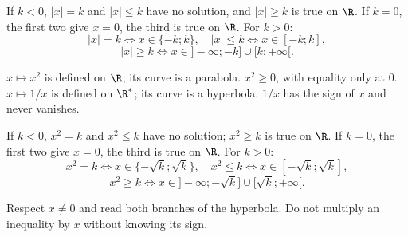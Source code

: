 \begin{cours}
If $k<0$, $|x|=k$ and $|x|\leq k$ have no solution, and $|x|\geq k$ is true on $\R$. If $k=0$, the first two give $x=0$, the third is true on $\R$. For $k>0$:
\[|x|=k\iff x\in\{-k;k\},\quad |x|\leq k\iff x\in[-k;k],\]
\[|x|\geq k\iff x\in]-\infty;-k]\cup[k;+\infty[.\]
\end{cours}
\reponse[1.6]{$\{-5;5\}$; $\varnothing$; $[-3;3]$; $]-\infty;-4]\cup[4;+\infty[$.}
\begin{cours}
$x\mapsto x^2$ is defined on $\R$; its curve is a parabola. $x^2\geq0$, with equality only at $0$.
$x\mapsto1/x$ is defined on $\R^*$; its curve is a hyperbola. $1/x$ has the sign of $x$ and never vanishes.
\end{cours}
\begin{center}
\end{center}
\begin{cours}
If $k<0$, $x^2=k$ and $x^2\leq k$ have no solution; $x^2\geq k$ is true on $\R$. If $k=0$, the first two give $x=0$, the third is true on $\R$. For $k>0$:
\[x^2=k\iff x\in\{-\sqrt k;\sqrt k\},\quad x^2\leq k\iff x\in[-\sqrt k;\sqrt k],\]
\[x^2\geq k\iff x\in]-\infty;-\sqrt k]\cup[\sqrt k;+\infty[.\]
\end{cours}
\reponse[3.2]{$\{-2;2\}$; $\varnothing$; $]-\infty;-2]\cup[2;+\infty[$; $\R$; $\{1/4\}$; $\varnothing$. More generally, $1/x=k$ has the unique solution $1/k$ if $k\ne0$, none if $k=0$.}
\begin{methode}
Respect $x\ne0$ and read both branches of the hyperbola. Do not multiply an inequality by $x$ without knowing its sign.
\end{methode}

